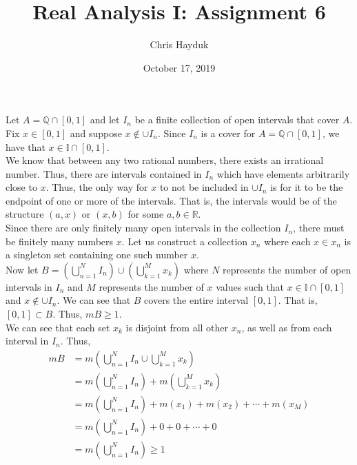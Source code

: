 \documentclass[12pt]{article}
\newenvironment{problem}[2][Problem]{\begin{trivlist}
\item[\hskip \labelsep {\bfseries #1}\hskip \labelsep {\bfseries #2.}]}{\end{trivlist}}
\begin{document}
\title{Real Analysis I: Assignment 6}

\author{Chris Hayduk}
\date{October 17, 2019}

\maketitle

\begin{problem}{1}
\end{problem}

Let $A = \mathbb{Q} \cap [0, 1]$ and let ${I_n}$ be a finite collection of open intervals that cover $A$.\\

Fix $x \in [0, 1]$ and suppose $x \not\in \cup I_n$. Since $I_n$ is a cover for $A = \mathbb{Q} \cap [0, 1]$, we have that $x \in \mathbb{I} \cap [0, 1]$.\\

We know that between any two rational numbers, there exists an irrational number. Thus, there are intervals contained in ${I_n}$ which have elements arbitrarily close to $x$. Thus, the only way for $x$ to not be included in $\cup I_n$ is for it to be the endpoint of one or more of the intervals. That is, the intervals would be of the structure $(a, x)$ or $(x, b)$ for some $a, b \in \mathbb{R}$.\\

Since there are only finitely many open intervals in the collection ${I_n}$, there must be finitely many numbers $x$. Let us construct a collection ${x_n}$ where each ${x} \in {x_n}$ is a singleton set containing one such number $x$.\\

Now let $B = \left(\bigcup_{n=1}^{N} I_n \right) \cup \left(\bigcup_{k=1}^{M} x_k \right)$ where $N$ represents the number of open intervals in ${I_n}$ and $M$ represents the number of $x$ values such that $x \in \mathbb{I} \cap [0, 1]$ and $x \not\in \cup I_n$. We can see that $B$ covers the entire interval $[0, 1]$. That is, $[0, 1] \subset B$. Thus, $mB \geq 1$.\\

We can see that each set ${x_k}$ is disjoint from all other ${x_n}$, as well as from each interval in ${I_n}$. Thus,
\begin{align*}
mB &= m\left(\bigcup_{n=1}^{N} I_n \cup \bigcup_{k=1}^{M} x_k \right)\\
&= m\left(\bigcup_{n=1}^{N} I_n \right) +  m\left(\bigcup_{k=1}^{M} x_k \right)\\
&= m\left(\bigcup_{n=1}^{N} I_n \right) +  m(x_1) + m(x_2) + \cdots + m(x_M)\\
&= m\left(\bigcup_{n=1}^{N} I_n \right) + 0 + 0 + \cdots + 0\\
&= m\left(\bigcup_{n=1}^{N} I_n \right) \geq 1
\end{align*}
\end{document}
